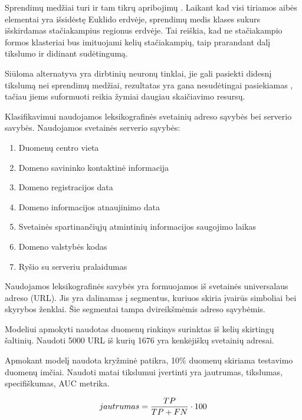 Sprendimų medžiai turi ir tam tikrų apribojimų \cite{c45}. Laikant kad visi tiriamos aibės elementai yra išsidėstę Euklido erdvėje, sprendimų medis klases sukurs išskirdamas stačiakampius regionus erdvėje. Tai reiškia, kad ne stačiakampio formos klasteriai bus imituojami kelių stačiakampių, taip prarandant dalį tikslumo ir didinant sudėtingumą.

Siūloma alternatyva \cite{c45} yra dirbtinių neuronų tinklai, jie gali pasiekti didesnį tikslumą nei sprendimų medžiai, rezultatas yra gana nesudėtingai pasiekiamas \cite{c45}, tačiau jiems suformuoti reikia žymiai daugiau skaičiavimo resursų.

Klasifikavimui naudojamos leksikografinės svetainių adreso sąvybės bei serverio savybės. Naudojamos svetainės serverio sąvybės:
\begin{enumerate}[label=\arabic*.]
    \item Duomenų centro vieta
    \item Domeno savininko kontaktinė informacija
    \item Domeno registracijos data
    \item Domeno informacijos atnaujinimo data
    \item Svetainės spartinančiųjų atmintinių informacijos saugojimo laikas
    \item Domeno valstybės kodas
    \item Ryšio su serveriu pralaidumas
\end{enumerate}

Naudojamos leksikografinės savybės yra formuojamos iš svetainės universalaus adreso (URL). Jis yra dalinamas į segmentus, kuriuos skiria įvairūs simboliai bei skyrybos ženklai. Šie segmentai tampa dvireikšmėmis adreso sąvybėmis.


Modeliui apmokyti naudotas duomenų rinkinys surinktas iš kelių skirtingų šaltinių. Naudoti 5000 URL iš kurių 1676 yra kenkėjiškų svetainių adresai.


Apmokant modelį naudota kryžminė patikra, 10\% duomenų skiriama testavimo duomenų imčiai. Naudoti matai tikslumui įvertinti yra jautrumas, tikslumas, specifiškumas, AUC metrika.

\begin{equation}\label{eq:jautrumas}
jautrumas = {TP \over {TP + FN}} \cdot 100
\end{equation}

